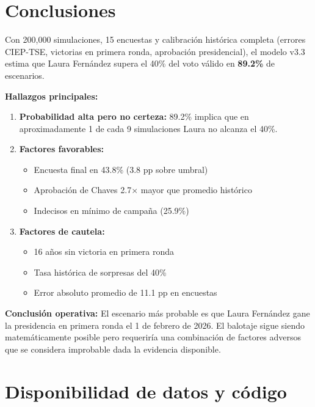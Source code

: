 \documentclass[11pt,a4paper]{article}
\begin{document}
\section{Conclusiones}

Con 200,000 simulaciones, 15 encuestas y calibración histórica completa (errores CIEP-TSE, victorias en primera ronda, aprobación presidencial), el modelo v3.3 estima que Laura Fernández supera el 40\% del voto válido en \textbf{89.2\%} de escenarios.

\textbf{Hallazgos principales:}

\begin{enumerate}
    \item \textbf{Probabilidad alta pero no certeza:} 89.2\% implica que en aproximadamente 1 de cada 9 simulaciones Laura no alcanza el 40\%.
    
    \item \textbf{Factores favorables:}
    \begin{itemize}
        \item Encuesta final en 43.8\% (3.8 pp sobre umbral)
        \item Aprobación de Chaves 2.7$\times$ mayor que promedio histórico
        \item Indecisos en mínimo de campaña (25.9\%)
    \end{itemize}
    
    \item \textbf{Factores de cautela:}
    \begin{itemize}
        \item 16 años sin victoria en primera ronda
        \item Tasa histórica de sorpresas del 40\%
        \item Error absoluto promedio de 11.1 pp en encuestas
    \end{itemize}
\end{enumerate}

\textbf{Conclusión operativa:} El escenario más probable es que Laura Fernández gane la presidencia en primera ronda el 1 de febrero de 2026. El balotaje sigue siendo matemáticamente posible pero requeriría una combinación de factores adversos que se considera improbable dada la evidencia disponible.

\section*{Disponibilidad de datos y código}
\end{document}
